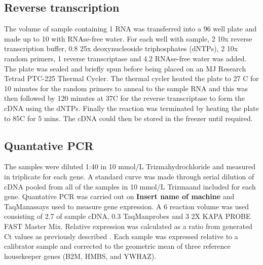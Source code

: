 \subsection{Reverse transcription}

The volume of sample containing 1 \ug RNA was transferred into a 96 well plate and made up to 10 \uL with RNAse-free water. For each well with sample, 2 \uL 10x reverse transcription buffer, 0.8 \uL 25x deoxynucleoside triphosphates (dNTPs), 2 \uL 10x random primers, 1 \uL reverse transcriptase and 4.2 \uL RNAse-free water was added. The plate was sealed and briefly spun before being placed on an MJ Research Tetrad PTC-225 Thermal Cycler. The thermal cycler heated the plate to 27 \textdegree C for 10 minutes for the random primers to anneal to the sample RNA and this was then followed by 120 minutes at 37\textdegree C for the reverse transcriptase to form the cDNA using the dNTPs. Finally the reaction was terminated by heating the plate to 85\textdegree C for 5 mins. The cDNA could then be stored in the freezer until required. 

\subsection{Quantative PCR}

The samples were diluted 1:40 in 10 mmol/L Trizma\R hydrochloride and measured in triplicate for each gene. A standard curve was made through serial dilution of cDNA pooled from all of the samples in 10 mmol/L Trizma\R and included for each gene. Quantative PCR was carried out on \textbf{Insert name of machine} and TaqMan\R assays used to measure gene expression. A 6 \uL reaction volume was used consisting of 2.7 \uL of sample cDNA, 0.3 \uL TaqMan\R probes and 3 \uL 2X KAPA PROBE FAST Master Mix. Relative expression was calculated as a ratio from generated Ct values as previously described \cite{Pfaffl2001ARTPCR}. Each sample was expressed relative to a calibrator sample and corrected to the geometric mean of three reference housekeeper genes (B2M, HMBS, and YWHAZ).